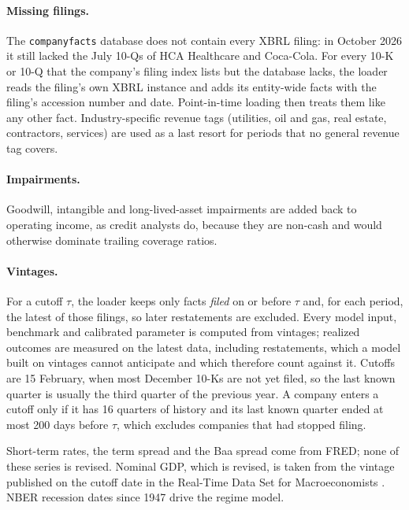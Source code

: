 \paragraph{Missing filings.} The \texttt{companyfacts} database does not contain every XBRL filing: in October 2026 it still lacked the July 10-Qs of HCA Healthcare and Coca-Cola. For every 10-K or 10-Q that the company's filing index lists but the database lacks, the loader reads the filing's own XBRL instance and adds its entity-wide facts with the filing's accession number and date. Point-in-time loading then treats them like any other fact. Industry-specific revenue tags (utilities, oil and gas, real estate, contractors, services) are used as a last resort for periods that no general revenue tag covers.

\paragraph{Impairments.} Goodwill, intangible and long-lived-asset impairments are added back to operating income, as credit analysts do, because they are non-cash and would otherwise dominate trailing coverage ratios.

\paragraph{Vintages.} For a cutoff $\tau$, the loader keeps only facts \emph{filed} on or before $\tau$ and, for each period, the latest of those filings, so later restatements are excluded. Every model input, benchmark and calibrated parameter is computed from vintages; realized outcomes are measured on the latest data, including restatements, which a model built on vintages cannot anticipate and which therefore count against it. Cutoffs are 15 February, when most December 10-Ks are not yet filed, so the last known quarter is usually the third quarter of the previous year. A company enters a cutoff only if it has 16 quarters of history and its last known quarter ended at most 200 days before $\tau$, which excludes companies that had stopped filing.

Short-term rates, the term spread and the Baa spread come from FRED; none of these series is revised. Nominal GDP, which is revised, is taken from the vintage published on the cutoff date in the Real-Time Data Set for Macroeconomists \citep{croushore2001}. NBER recession dates since 1947 drive the regime model.

